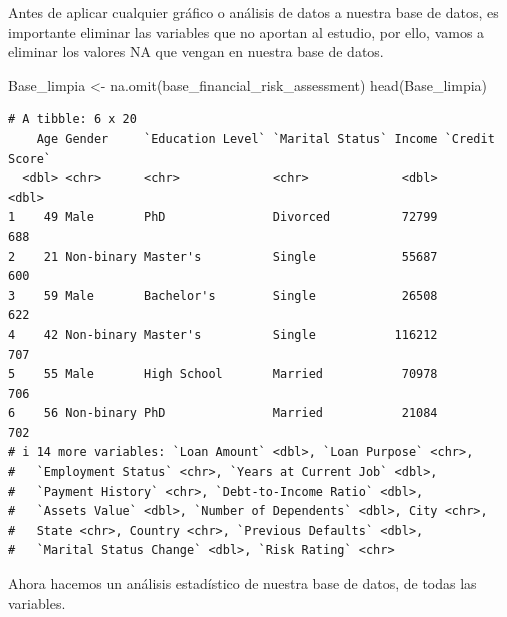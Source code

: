 \documentclass[
  letterpaper,
  DIV=11,
  numbers=noendperiod]{scrreprt}
\newenvironment{Shaded}{\begin{snugshade}}{\end{snugshade}}
\newcommand{\FunctionTok}[1]{\textcolor[rgb]{0.28,0.35,0.67}{#1}}
\newcommand{\NormalTok}[1]{\textcolor[rgb]{0.00,0.23,0.31}{#1}}
\newcommand{\OtherTok}[1]{\textcolor[rgb]{0.00,0.23,0.31}{#1}}
\begin{document}
Antes de aplicar cualquier gráfico o análisis de datos a nuestra base de
datos, es importante eliminar las variables que no aportan al estudio,
por ello, vamos a eliminar los valores NA que vengan en nuestra base de
datos.

\begin{Shaded}
\begin{Highlighting}[]
\NormalTok{Base\_limpia }\OtherTok{\textless{}{-}} \FunctionTok{na.omit}\NormalTok{(base\_financial\_risk\_assessment)}
\FunctionTok{head}\NormalTok{(Base\_limpia)}
\end{Highlighting}
\end{Shaded}

\begin{verbatim}
# A tibble: 6 x 20
    Age Gender     `Education Level` `Marital Status` Income `Credit Score`
  <dbl> <chr>      <chr>             <chr>             <dbl>          <dbl>
1    49 Male       PhD               Divorced          72799            688
2    21 Non-binary Master's          Single            55687            600
3    59 Male       Bachelor's        Single            26508            622
4    42 Non-binary Master's          Single           116212            707
5    55 Male       High School       Married           70978            706
6    56 Non-binary PhD               Married           21084            702
# i 14 more variables: `Loan Amount` <dbl>, `Loan Purpose` <chr>,
#   `Employment Status` <chr>, `Years at Current Job` <dbl>,
#   `Payment History` <chr>, `Debt-to-Income Ratio` <dbl>,
#   `Assets Value` <dbl>, `Number of Dependents` <dbl>, City <chr>,
#   State <chr>, Country <chr>, `Previous Defaults` <dbl>,
#   `Marital Status Change` <dbl>, `Risk Rating` <chr>
\end{verbatim}

Ahora hacemos un análisis estadístico de nuestra base de datos, de todas
las variables.
\end{document}

